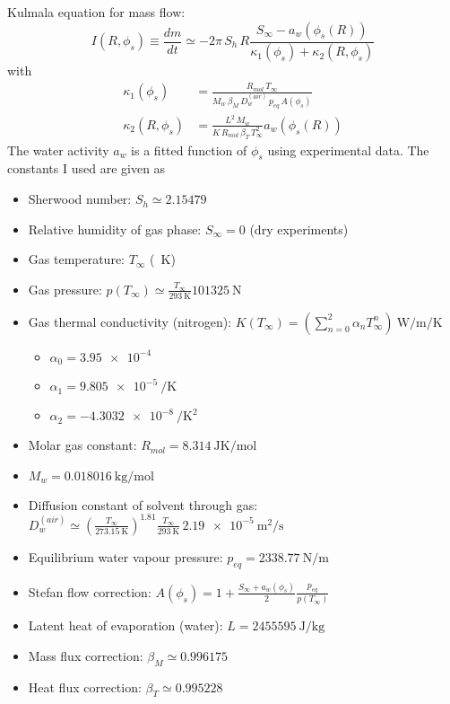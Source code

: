 \documentclass[12pt]{report}
\begin{document}
Kulmala equation for mass flow:
\begin{equation}
  I(R, \phi_s)%
  \equiv \frac{dm}{dt}
  \simeq -2\pi \, S_h \, R \frac{S_{\infty} - a_w(\phi_s(R))}{\kappa_1(\phi_s) + \kappa_2(R, \phi_s)}
\end{equation}
with
\begin{align}
  \kappa_1(\phi_s) &= \frac{R_{mol} \, T_\infty}{M_w \, \beta_M \, D_w^{(air)} \, p_{eq} \, A(\phi_s)} \\
  \kappa_2(R, \phi_s) &= \frac{L^2 \, M_w}{K \, R_{mol} \, \beta_T \, T_\infty^2} a_w(\phi_s(R))
\end{align}
The water activity $a_w$ is a fitted function of $\phi_s$ using experimental data.
The constants I used are given as
\begin{itemize}
\item Sherwood number: $S_h \simeq 2.15479$
\item Relative humidity of gas phase: $S_\infty = 0$ (dry experiments)
\item Gas temperature: $T_\infty$ (\SI{}{\kelvin})
\item Gas pressure: $p(T_\infty) \simeq \frac{T_\infty}{\SI{293}{\kelvin}} \SI{101325}{\newton}$
\item Gas thermal conductivity (nitrogen): $K(T_\infty) = \left(\sum_{n=0}^2 \alpha_n T_\infty^n \right) \SI{}{\watt\per\meter\per\kelvin}$
  \begin{itemize}
  \item $\alpha_0 = \SI{3.95e-4}{}$
  \item $\alpha_1 = \SI{9.805e-5}{\per\kelvin}$
  \item $\alpha_2 = \SI{-4.3032e-8}{\per\square\kelvin}$
  \end{itemize}
\item Molar gas constant: $R_{mol} = \SI{8.314}{\joule\kelvin\per\mol}$
\item $M_w = \SI{0.018016}{\kilogram\per\mol}$
\item Diffusion constant of solvent through gas:
  $D_w^{(air)} \simeq \left(\frac{T_\infty}{\SI{273.15}{\kelvin}}\right)^{1.81} \frac{T_\infty}{\SI{293}{\kelvin}} \, \SI{2.19e-5}{\square\meter\per\second}$
\item Equilibrium water vapour pressure: $p_{eq} = \SI{2338.77}{\newton\per\meter}$
\item Stefan flow correction: $A(\phi_s) = 1 + \frac{S_\infty + a_w(\phi_s)}{2} \frac{p_{eq}}{p(T_\infty)}$
\item Latent heat of evaporation (water): $L = \SI{2455595}{\joule\per\kilogram}$
\item Mass flux correction: $\beta_M \simeq 0.996175$
\item Heat flux correction: $\beta_T \simeq 0.995228$
\end{itemize}
\end{document}
